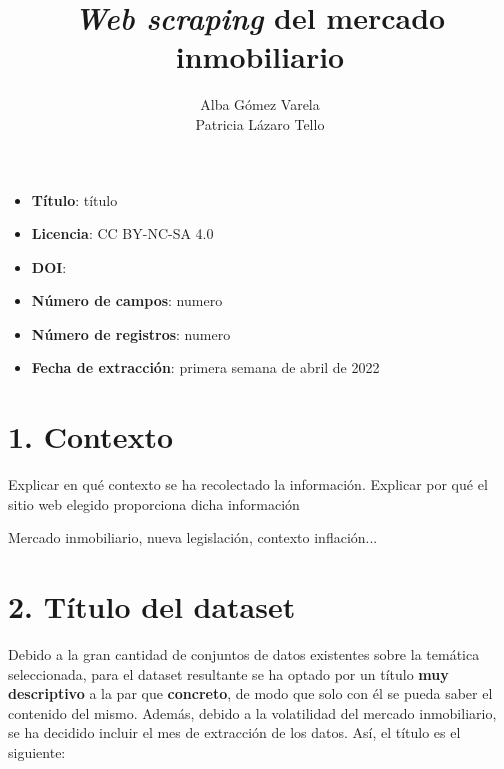 \documentclass[12pt]{article}
\title{\textit{Web scraping} del mercado inmobiliario}
\author{Alba Gómez Varela\\Patricia Lázaro Tello}
\date{}	%
\begin{document}

\maketitle
\thispagestyle{uoc}

\vspace{-2em}
\begin{framed}
	\begin{multicols}{2}
		\begin{itemize}[topsep=0cm,partopsep=0cm,label={},wide]
			\item \textbf{Título}: título
			\item \textbf{Licencia}: CC BY-NC-SA 4.0
			\item \textbf{DOI}:
			\columnbreak
			\item \textbf{Número de campos}: numero
			\item \textbf{Número de registros}: numero
			\item \textbf{Fecha de extracción}: primera semana de abril de 2022
		\end{itemize}
	\end{multicols}
\end{framed}

\vspace{-2em}

\section*{1. Contexto}\vspace{-1.5em}

Explicar en qué contexto se ha recolectado la información. Explicar
por qué el sitio web elegido proporciona dicha información

Mercado inmobiliario, nueva legislación, contexto inflación...

\section*{2. Título del dataset }\vspace{-1.5em}

Debido a la gran cantidad de conjuntos de datos existentes sobre la temática seleccionada, para el dataset resultante se ha optado por un título\textbf{ muy descriptivo} a la par que \textbf{concreto}, de modo que solo con él se pueda saber el contenido del mismo. Además, debido a la volatilidad del mercado inmobiliario, se ha decidido incluir el mes de extracción de los datos. Así, el título es el siguiente: 
\end{document}
